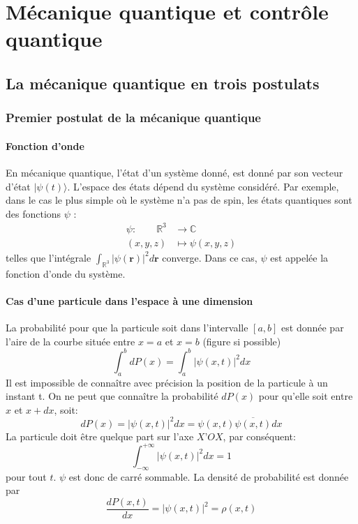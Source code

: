 \chapter{Mécanique quantique et contrôle quantique}

\section{La mécanique quantique en trois postulats}
\subsection{Premier postulat de la mécanique quantique}
\subsubsection{Fonction d'onde}
En mécanique quantique, l'état d'un système donné, est donné par son vecteur d'état $|\psi (t)\rangle$. 
L'espace des états dépend du système considéré. Par exemple, dans le cas le plus simple où le système n'a pas de spin, les états quantiques sont des fonctions $\psi$ :
$$
\begin{aligned}
	\psi :\quad \quad \mathbb {R} ^{3}&\rightarrow \mathbb{C} \\(x,y,z)&\mapsto \psi (x,y,z)
\end{aligned}
$$
telles que l'intégrale  $\int _{\mathbb{R} ^{3}}|\psi (\mathbf{r} )|^{2}d\mathbf{r}$ converge. Dans ce cas, $\psi$ est appelée la fonction d'onde du système.
\subsubsection{Cas d’une particule dans l’espace à une dimension}
La probabilité pour que la particule soit dans l’intervalle $[a,b]$ est donnée par l’aire de la courbe située entre $x=a$ et $x=b$ (figure si possible)
\begin{equation}
\int_a^b dP(x)= \int_a^b |\psi(x,t)|^2dx
\end{equation}
Il est impossible de connaître avec précision la position de la particule à un instant t. On ne peut que connaître la probabilité $dP(x)$ pour qu’elle soit entre $x$ et $x+dx$, soit:
\begin{equation}
dP(x)=|\psi(x,t)|^2dx=\psi(x,t)\overline{\psi(x,t)}dx
\end{equation}
La particule doit être quelque part sur l’axe $X’OX$, par conséquent:
\begin{equation}
\int_{-\infty}^{+\infty}|\psi(x,t)|^2dx=1
\end{equation}
pour tout $t$. $\psi$ est donc de carré sommable.
La densité de probabilité est donnée par
\begin{equation}
\dfrac{dP(x,t)}{dx}=|\psi(x,t)|^2=\rho(x,t)
\end{equation}

